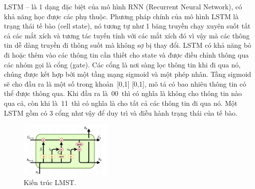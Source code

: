LSTM – là 1 dạng đặc biệt của mô hình RNN (Recurrent Neural Network), có khả năng học được các phụ thuộc. Phương pháp chính của mô hình LSTM là trạng thái tế bào (cell state), nó tương tự như 1 băng truyền chạy xuyên suốt tất cả các mắt xích và tương tác tuyến tính với các mắt xích đó vì vậy mà các thông tin dễ dàng truyền đi thông suốt mà không sợ bị thay đổi. LSTM có khả năng bỏ đi hoặc thêm vào các thông tin cần thiết cho state và được điều chỉnh thông qua các nhóm gọi là cổng (gate). Các cổng là nơi sàng lọc thông tin khi đi qua nó, chúng được kết hợp bởi một tầng mạng sigmoid và một phép nhân. Tầng sigmoid sẽ cho đầu ra là một số trong khoản [0,1] [0,1], mô tả có bao nhiêu thông tin có thể được thông qua. Khi đầu ra là 00 thì có nghĩa là không cho thông tin nào qua cả, còn khi là 11 thì có nghĩa là cho tất cả các thông tin đi qua nó. Một LSTM gồm có 3 cổng như vậy để duy trì và điều hành trạng thái của tế bào.

\begin{figure}[htbp]
\centerline{\includegraphics[width=0.4\textwidth]{img/LSTM.jpg}}
\caption{Kiến trúc LMST.}
\label{fig}
\end{figure}